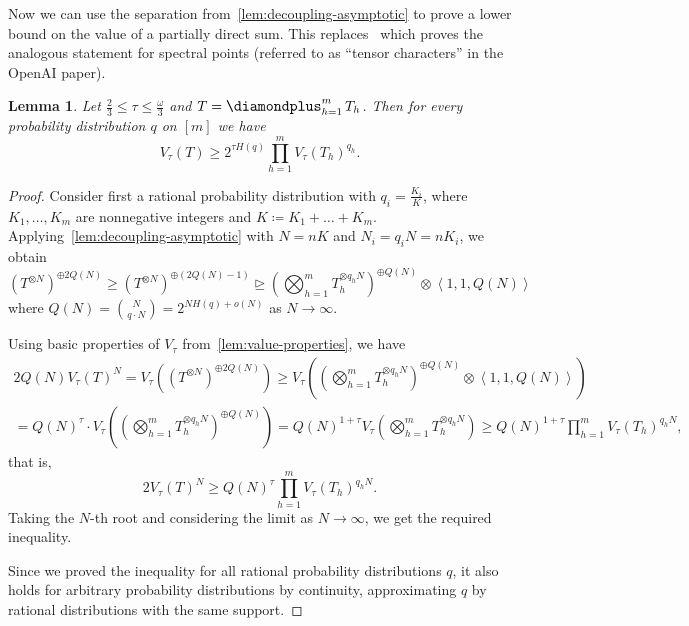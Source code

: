 \documentclass[11pt,letterpaper]{article}
\newtheorem{lemma}[theorem]{Lemma}\AddToHook{env/lemma/begin}{\crefalias{theorem}{lemma}}
\numberwithin{equation}{section}
\DeclareMathOperator*{\bigdiamondplus}{\scalerel*{\diamondplus}{\bigoplus}}
\begin{document}
Now we can use the separation from~\cref{lem:decoupling-asymptotic} to prove a lower bound on the value of a partially direct sum.
This replaces~\cite[Corollary~3.2]{chatgpt-paper} which proves the analogous statement for spectral points (referred to as
``tensor characters'' in the OpenAI paper).

\begin{lemma}\label{lem:diamondsum-value-prob}
  Let $\frac23\leq \tau \leq \frac{\omega}{3}$ and $T = \bigdiamondplus_{h = 1}^{m} T_h$.
  Then for every probability distribution $q$ on $[m]$ we have \[V_\tau(T) \geq 2^{\tau H(q)} \prod_{h = 1}^{m} V_\tau(T_h)^{q_h}.\]
\end{lemma}
\begin{proof}
    Consider first a rational probability distribution with $q_i = \frac{K_i}{K}$, where $K_1,\dots,K_m$ are nonnegative integers and $K\coloneqq K_1+\dots+K_m$.
    Applying~\cref{lem:decoupling-asymptotic} with $N = nK$ and $N_i = q_i N = nK_i$, we obtain
    \[ (T^{\otimes N})^{\oplus 2Q(N)} \geq (T^{\otimes N})^{\oplus (2Q(N) - 1)} \trianglerighteq (\bigotimes_{h = 1}^{m} T_h^{\otimes q_h N})^{\oplus Q(N)} \otimes \left<1,1,Q(N)\right>\] where $Q(N) = \binom{N}{q\cdot N} = 2^{N H(q) + o(N)}$ as $N \to \infty$.

    Using basic properties of $V_\tau$ from~\cref{lem:value-properties}, we have
    \begin{multline*}
    2Q(N) V_\tau(T)^N = V_\tau((T^{\otimes N})^{\oplus 2Q(N)}) \geq V_\tau((\bigotimes_{h = 1}^{m} T_h^{\otimes q_h
    N})^{\oplus Q(N)} \otimes \left<1,1,Q(N)\right>) \\= Q(N)^\tau \cdot V_\tau((\bigotimes_{h = 1}^{m}
    T_h^{\otimes q_h N})^{\oplus Q(N)}) = Q(N)^{1 + \tau} V_\tau(\bigotimes_{h = 1}^{m} T_h^{\otimes q_h N}) \geq Q(N)^{1 + \tau} \prod_{h = 1}^{m} V_\tau(T_h)^{q_h N},
    \end{multline*}
    that is,
    \[2 V_\tau(T)^N \geq Q(N)^\tau \prod_{h = 1}^{m} V_\tau(T_h)^{q_h N}.\]
    Taking the $N$-th root and considering the limit as $N \to \infty$, we get the required inequality.

    Since we proved the inequality for all rational probability distributions $q$, it also holds for arbitrary probability distributions by continuity, approximating $q$ by rational distributions with the same support.
\end{proof}
\end{document}
